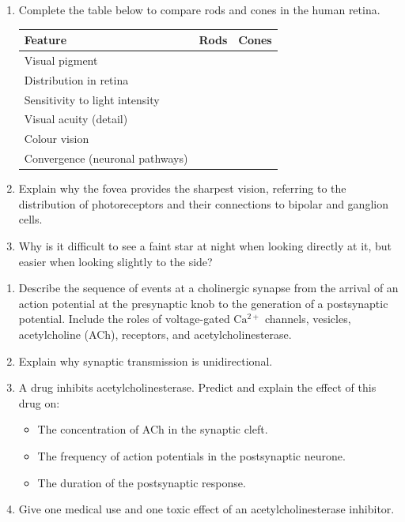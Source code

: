 \documentclass[11pt]{article}
\begin{document}
\begin{exercice}
\begin{enumerate}
\item Complete the table below to compare rods and cones in the human retina.

\begin{center}
\begin{tabularx}{\linewidth}{|l|X|X|}\hline
\textbf{Feature} & \textbf{Rods} & \textbf{Cones} \\ \hline
Visual pigment & & \\ \hline
Distribution in retina & & \\ \hline
Sensitivity to light intensity & & \\ \hline
Visual acuity (detail) & & \\ \hline
Colour vision & & \\ \hline
Convergence (neuronal pathways) & & \\ \hline
\end{tabularx}
\end{center}

\item Explain why the fovea provides the sharpest vision, referring to the distribution of photoreceptors and their connections to bipolar and ganglion cells.
\item Why is it difficult to see a faint star at night when looking directly at it, but easier when looking slightly to the side?
\end{enumerate}
\end{exercice}

\begin{exercice}
\begin{enumerate}
\item Describe the sequence of events at a cholinergic synapse from the arrival of an action potential at the presynaptic knob to the generation of a postsynaptic potential. Include the roles of voltage-gated $\mathrm{Ca^{2+}}$ channels, vesicles, acetylcholine (ACh), receptors, and acetylcholinesterase.
\item Explain why synaptic transmission is unidirectional.
\item A drug inhibits acetylcholinesterase. Predict and explain the effect of this drug on:
\begin{itemize}
\item The concentration of ACh in the synaptic cleft.
\item The frequency of action potentials in the postsynaptic neurone.
\item The duration of the postsynaptic response.
\end{itemize}
\item Give one medical use and one toxic effect of an acetylcholinesterase inhibitor.
\end{enumerate}
\end{exercice}
\end{document}

